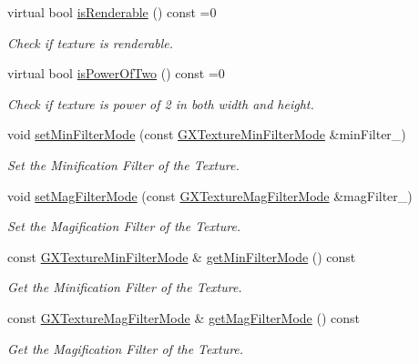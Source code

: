 \begin{DoxyCompactItemize}
virtual bool \hyperlink{class_magnum_1_1_texture_base_a7e4d11ffd40d1a83e8838b5fc60cc4c2}{is\+Renderable} () const  =0
\begin{DoxyCompactList}\small\item\em Check if texture is renderable. \end{DoxyCompactList}\item 
virtual bool \hyperlink{class_magnum_1_1_texture_base_ac9975783371f732b546ce5b2680f23e3}{is\+Power\+Of\+Two} () const  =0
\begin{DoxyCompactList}\small\item\em Check if texture is power of 2 in both width and height. \end{DoxyCompactList}\item 
void \hyperlink{class_magnum_1_1_texture_base_a8aa04ad5a3fa29add142a66d46845655}{set\+Min\+Filter\+Mode} (const \hyperlink{class_magnum_1_1_g_x_texture_min_filter_mode}{G\+X\+Texture\+Min\+Filter\+Mode} \&min\+Filter\+\_\+)
\begin{DoxyCompactList}\small\item\em Set the Minification Filter of the Texture. \end{DoxyCompactList}\item 
void \hyperlink{class_magnum_1_1_texture_base_a9ee607111c487e04b9eed86e3d17c214}{set\+Mag\+Filter\+Mode} (const \hyperlink{class_magnum_1_1_g_x_texture_mag_filter_mode}{G\+X\+Texture\+Mag\+Filter\+Mode} \&mag\+Filter\+\_\+)
\begin{DoxyCompactList}\small\item\em Set the Magification Filter of the Texture. \end{DoxyCompactList}\item 
const \hyperlink{class_magnum_1_1_g_x_texture_min_filter_mode}{G\+X\+Texture\+Min\+Filter\+Mode} \& \hyperlink{class_magnum_1_1_texture_base_a6f0c58f9dc21de5f403fa1690e30d897}{get\+Min\+Filter\+Mode} () const 
\begin{DoxyCompactList}\small\item\em Get the Minification Filter of the Texture. \end{DoxyCompactList}\item 
const \hyperlink{class_magnum_1_1_g_x_texture_mag_filter_mode}{G\+X\+Texture\+Mag\+Filter\+Mode} \& \hyperlink{class_magnum_1_1_texture_base_a468a5b6087e37705a6483fdead526985}{get\+Mag\+Filter\+Mode} () const 
\begin{DoxyCompactList}\small\item\em Get the Magification Filter of the Texture. \end{DoxyCompactList}\item 

\end{DoxyCompactItemize}
